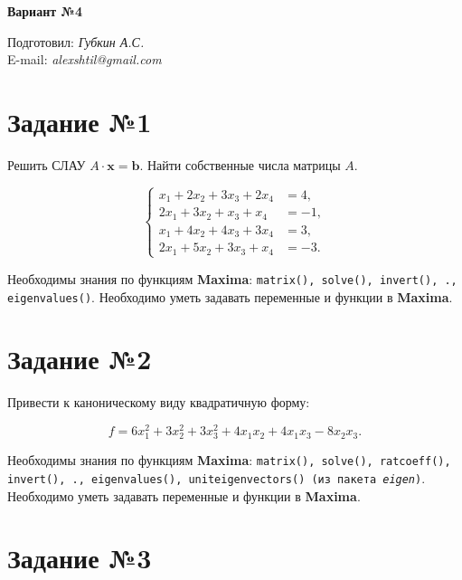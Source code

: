\begin{center}
    \textbf{\huge Вариант №4}
\end{center}

\begin{flushright}
    Подготовил: \textit{Губкин А.С.}\\
    E-mail: \textit{alexshtil@gmail.com}\\
\end{flushright}

\section*{Задание №1}

    Решить СЛАУ $A \cdot \mathbf{x} = \mathbf{b}$. Найти собственные числа матрицы $A$.

    \[
        \left\{
            \begin{aligned}
                x_{1} + 2 x_{2} + 3 x_{3} + 2 x_{4} &= 4,\\
                2 x_{1} + 3 x_{2} + x_{3} + x_{4} &= -1,\\
                x_{1} + 4 x_{2} + 4 x_{3} + 3 x_{4} &= 3,\\
                2 x_{1} + 5 x_{2} + 3 x_{3} + x_{4} &= -3.
            \end{aligned}
        \right.
    \]

    Необходимы знания по функциям \textbf{Maxima}: {\tt matrix(), solve(), invert(), ., eigenvalues()}. Необходимо уметь задавать переменные и функции в \textbf{Maxima}.

\section*{Задание №2}

    Привести к каноническому виду квадратичную форму: 

    \[
        f = 6 x^{2}_{1} + 3 x^{2}_{2} + 3 x^{2}_{3} + 4 x_{1} x_{2} + 4 x_{1} x_{3} - 8 x_{2} x_{3}.
    \]

    Необходимы знания по функциям \textbf{Maxima}: {\tt matrix(), solve(), ratcoeff(), invert(), ., eigenvalues(), uniteigenvectors() (из пакета \textit{eigen})}. Необходимо уметь задавать переменные и функции в \textbf{Maxima}.

\section*{Задание №3}

